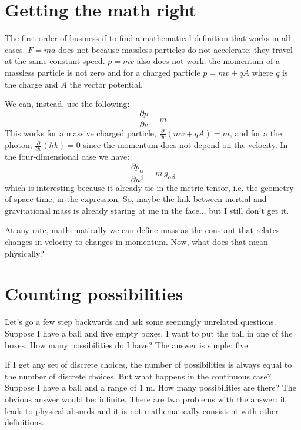 \documentclass[aps,pra,10pt,floatfix,nofootinbib]{revtex4-1}
\theoremstyle{definition}
\begin{document}
\section{Getting the math right}

The first order of business if to find a mathematical definition that works in all cases. $F=ma$ does not because massless particles do not accelerate: they travel at the same constant speed. $p=mv$ also does not work: the momentum of a massless particle is not zero and for a charged particle $p=mv + qA$ where $q$ is the charge and $A$ the vector potential.

We can, instead, use the following:
\begin{equation}
\label{simpleMass}
\frac{\partial p}{\partial v} = m
\end{equation}
This works for a massive charged particle, $\frac{\partial}{\partial v} (mv + qA) = m$, and for a the photon, $\frac{\partial}{\partial v} (\hbar k) = 0$ since the momentum does not depend on the velocity. In the four-dimensional case we have:
\begin{equation}
\label{advancedMass}
\frac{\partial p_\alpha}{\partial u^\beta} = m \, g_{\alpha \beta}
\end{equation}
which is interesting because it already tie in the metric tensor, i.e. the geometry of space time, in the expression. So, maybe the link between inertial and gravitational mass is already staring at me in the face... but I still don't get it. 

At any rate, mathematically we can define mass as the constant that relates changes in velocity to changes in momentum. Now, what does that mean physically?

\section{Counting possibilities}

Let's go a few step backwards and ask some seemingly unrelated questions. Suppose I have a ball and five empty boxes. I want to put the ball in one of the boxes. How many possibilities do I have? The answer is simple: five.

If I get any set of discrete choices, the number of possibilities is always equal to the number of discrete choices. But what happens in the continuous case? Suppose I have a ball and a range of $1$ m. How many possibilities are there? The obvious answer would be: infinite. There are two problems with the answer: it leads to physical absurds and it is not mathematically consistent with other definitions.
\end{document}
